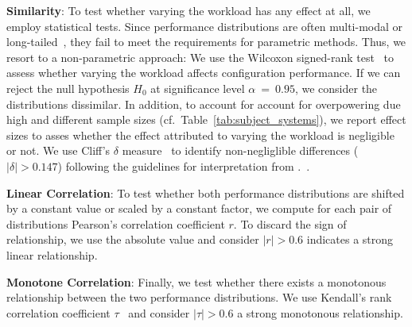 \begin{compactenum}
	\item \textbf{Similarity}: To test whether varying the workload has any effect at all, we employ statistical tests. Since performance distributions are often multi-modal or long-tailed~\cite{curtsinger_stabilizer_2013,maricq2018taming}, they fail to meet the requirements for parametric methods. 
	Thus, we resort to a non-parametric approach: We use the Wilcoxon signed-rank test~\cite{lovric_international_2010} to assess whether varying the workload affects configuration performance. If we can reject the null hypothesis $H_0$ at significance level $\alpha~=~0.95$, we consider the distributions dissimilar. In addition, to account for account for overpowering due high and different sample sizes (cf.~Table~\ref{tab:subject_systems}), we report effect sizes to asses whether the effect attributed to varying the workload is negligible or not. We use Cliff's $\delta$ measure~\cite{Cliff1993DominanceSO} to identify non-negliglible differences ($\vert \delta \vert > 0.147$) following the guidelines for interpretation from \citeauthor{romano2006exploring}.~\cite{romano2006exploring}.
	
	\item \textbf{Linear Correlation}: To test whether both performance distributions are shifted by a constant value or scaled by a constant factor, we compute for each pair of distributions Pearson's correlation coefficient $r$. To discard the sign of relationship, we use the absolute value and consider $\vert r\vert >0.6$ indicates a strong linear relationship. 
	
	\item \textbf{Monotone Correlation}: Finally, we test whether there exists a monotonous relationship between the two performance distributions. We use Kendall's rank correlation coefficient $\tau$~\cite{kendall1938new} and consider $\vert\tau\vert > 0.6$ a strong monotonous relationship.
\end{compactenum}

